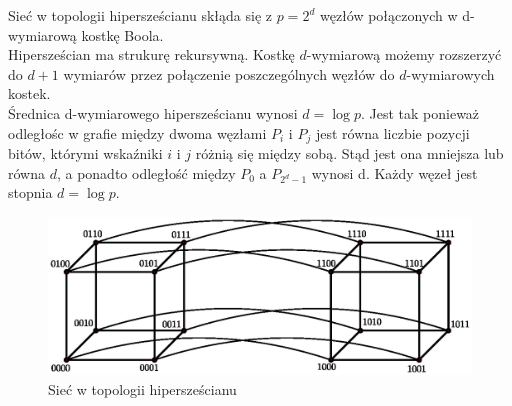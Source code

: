 \begin{przyklad}
Sieć w topologii hipersześcianu skłąda się z \(p=2^d\) węzłów połączonych w d-wymiarową kostkę Boola.\\

Hipersześcian ma strukurę rekursywną. Kostkę \(d\)-wymiarową możemy rozszerzyć do \(d+1\) wymiarów przez połączenie poszczególnych węzłów do \(d\)-wymiarowych kostek.\\

Średnica d-wymiarowego hipersześcianu wynosi \(d=\log{p}\). Jest tak ponieważ odległośc w grafie między dwoma węzłami \(P_i\) i \(P_j\) jest równa liczbie pozycji bitów, którymi wskaźniki \(i\) i \(j\) różnią się między sobą. Stąd jest ona mniejsza lub równa \(d\), a ponadto odległość między \(P_0\) a \(P_{2^d-1}\) wynosi d. Każdy węzeł jest stopnia \(d=\log{p}\).
\end{przyklad}	
\begin{figure}[h]
\centering
\includegraphics[width=32em]{images/systolic.eps}
\caption{Sieć w topologii hipersześcianu}
\label{fig:systolic}
\end{figure}
